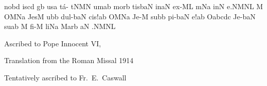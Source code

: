 \sgn n{o}b\punctum d\egn
\sgn {}is\punctum c\augmentum d\egn
\spatium
{}g\punctum b\egn
\sgn {}us\punctum a\egn
\sgn t{\'a}{- t}\porrectus NMN\egn
\sgn {}um\punctum a\augmentum b\egn
\spatium
\divisiominor
\spatium
\sgn m{o}r\punctum b\egn
\sgn tis\climacus baN\egn
\spatium
\sgn {}in\clivis aN\egn
\spatium
\sgn {}e{x-}\clivis ML\egn
{}m\pes Na\egn
\sgn {}in\punctum N\egn
\sgn {}e.\clivis NM\augmentumduplex NL\egn
\spatium
\divisiofinalis
\spatium
\custos M
\lineaproxima
\sgn {}O{}\scandicus MNa\egn
\spatium
\sgn J{e}{s}\punctum M\egn
\sgn {}u{}\punctum b\augmentum b\egn
\spatium
\sgn { }{}{}\egn
\sgn d{u}{l-}\climacus baN\egn
\sgn ci{s!}\punctum a\augmentum b\egn
\spatium
\divisiofinalis
\spatium
\sgn {}O{}\scandicus MNa\egn
\spatium
\sgn J{e}{-}\punctum M\egn
\sgn su{}\punctum b\augmentum b\egn
\spatium
\sgn p{i}{-}\climacus baN\egn
\sgn {}e!\punctum a\augmentum b\egn
\spatium
\divisiofinalis
\spatium
\sgn {}O{}\punctum a\augmentum b\torculus cdc\egn
\spatium
\sgn J{e}{-}\climacus baN\egn
\sgn su{}\punctum a\augmentum b\egn
\spatium
\custos M\lineaproxima
\sgn f{i}{-}\punctum M\egn
\sgn li{}\pes Na\egn
\spatium
\sgn Mar\punctum b\egn
\sgn {}{\'\i}{-}\clivis aN\egn
\endgroup
\sgn {}{\ae}.\clivis NM\augmentumduplex NL\egn
\spatium
\Finisgregoriana


\bigskip

\source Ascribed to Pope Innocent VI, {}

\source Translation from the Roman Missal 1914

\source Tentatively ascribed to Fr.~E.~Caswall

